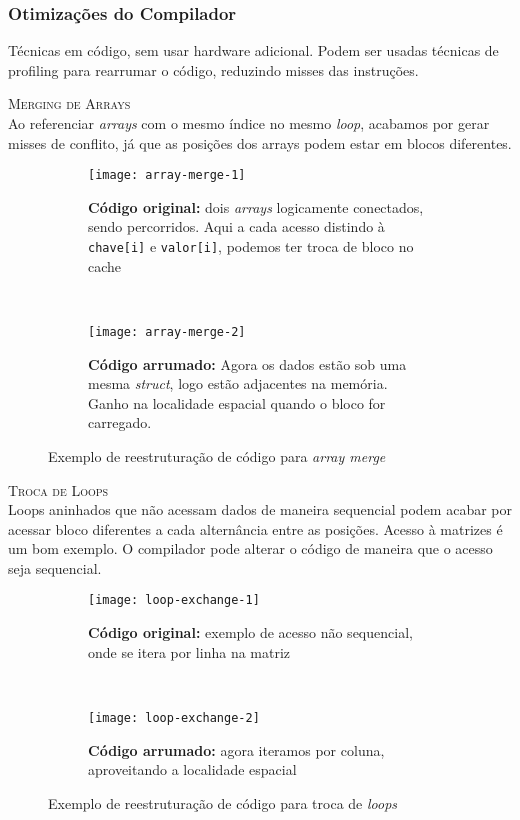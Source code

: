 \subsubsection{Otimizações do Compilador}
Técnicas em código, sem usar hardware adicional. Podem ser usadas técnicas de profiling para rearrumar o código, reduzindo misses das instruções.

\textsc{Merging de Arrays}\\
Ao referenciar \textit{arrays} com o mesmo índice no mesmo \textit{loop}, acabamos por gerar misses de conflito, já que as posições dos arrays podem estar em blocos diferentes.

\begin{figure*}[ht]
  \begin{subfigure}[t]{.5\textwidth}
    \centering
    \texttt{[image: array-merge-1]}
    \caption{\textbf{Código original:} dois \textit{arrays} logicamente conectados, sendo percorridos. Aqui a cada acesso distindo à \texttt{chave{[i]}} e \texttt{valor{[i]}}, podemos ter troca de bloco no cache}
  \end{subfigure}
  ~
  \begin{subfigure}[t]{.5\textwidth}
    \centering
    \texttt{[image: array-merge-2]}
    \caption{\textbf{Código arrumado:} Agora os dados estão sob uma mesma \textit{struct}, logo estão adjacentes na memória. Ganho na localidade espacial quando o bloco for carregado.}
  \end{subfigure}

  \caption{Exemplo de reestruturação de código para \textit{array merge}}
  \label{figs:array-merge}
\end{figure*}




\textsc{Troca de Loops}\\
Loops aninhados que não acessam dados de maneira sequencial podem acabar por acessar bloco diferentes a cada alternância entre as posições. Acesso à matrizes é um bom exemplo. O compilador pode alterar o código de maneira que o acesso seja sequencial.

\begin{figure*}[ht]
  \begin{subfigure}[t]{.5\textwidth}
    \centering
    \texttt{[image: loop-exchange-1]}
    \caption{\textbf{Código original:} exemplo de acesso não sequencial, onde se itera por linha na matriz}
  \end{subfigure}
  ~
  \begin{subfigure}[t]{.5\textwidth}
    \centering
    \texttt{[image: loop-exchange-2]}
    \caption{\textbf{Código arrumado:} agora iteramos por coluna, aproveitando a localidade espacial}
  \end{subfigure}

  \caption{Exemplo de reestruturação de código para troca de \textit{loops}}
  \label{figs:loop-exchange}
\end{figure*}



